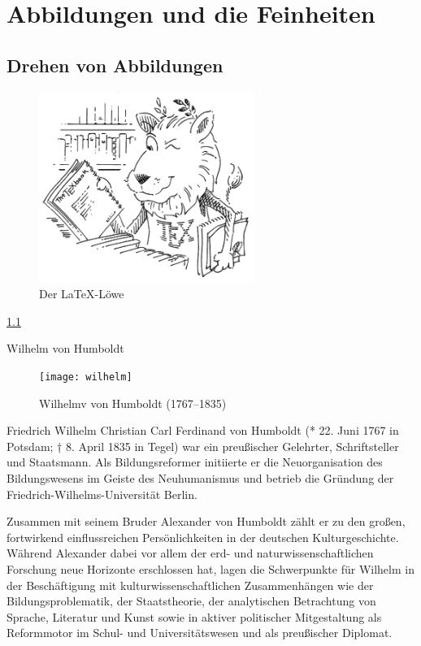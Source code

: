 
\chapter{Abbildungen und die Feinheiten}
\section{Drehen von Abbildungen}

\begin{figure}[h]
\includegraphics[trim=0cm 4cm 6cm 0cm, clip=true, width=7cm, angle=34]{figures/loewe.png}
\caption{Der \LaTeX-Löwe}
\label{fig:loewe}
\end{figure}

\ref{fig:loewe}





Wilhelm von Humboldt

\begin{figure}
\texttt{[image: wilhelm]}
\caption{Wilhelmv von Humboldt (1767--1835)}
\label{fig:wilhelm}
\end{figure}

Friedrich Wilhelm Christian Carl Ferdinand von Humboldt (* 22. Juni 1767 in Potsdam; † 8. April 1835 in Tegel) war ein preußischer Gelehrter, Schriftsteller und Staatsmann. Als Bildungsreformer initiierte er die Neuorganisation des Bildungswesens im Geiste des Neuhumanismus und betrieb die Gründung der Friedrich-Wilhelms-Universität Berlin.

Zusammen mit seinem Bruder Alexander von Humboldt zählt er zu den großen, fortwirkend einflussreichen Persönlichkeiten in der deutschen Kulturgeschichte. Während Alexander dabei vor allem der erd- und naturwissenschaftlichen Forschung neue Horizonte erschlossen hat, lagen die Schwerpunkte für Wilhelm in der Beschäftigung mit kulturwissenschaftlichen Zusammenhängen wie der Bildungsproblematik, der Staatstheorie, der analytischen Betrachtung von Sprache, Literatur und Kunst sowie in aktiver politischer Mitgestaltung als Reformmotor im Schul- und Universitätswesen und als preußischer Diplomat.

